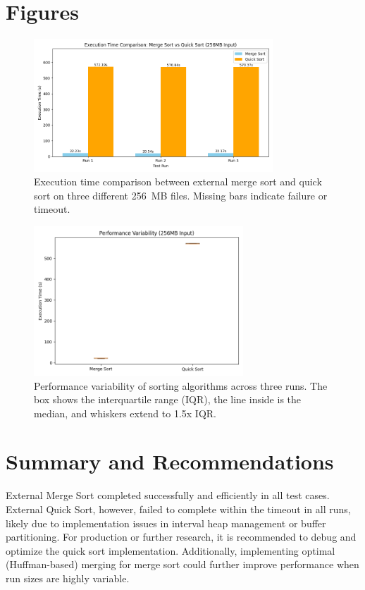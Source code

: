 \documentclass{article}
\begin{document}
\section*{Figures}
\begin{figure}[h!]
\centering
\includegraphics[width=0.8\textwidth]{figures/sort_times_comparison.png}
\caption{Execution time comparison between external merge sort and quick sort on three different 256~MB files. Missing bars indicate failure or timeout.}
\label{fig:sort_times_comparison}
\end{figure}

\begin{figure}[h!]
\centering
\includegraphics[width=0.7\textwidth]{figures/performance_variability.png}
\caption{Performance variability of sorting algorithms across three runs. The box shows the interquartile range (IQR), the line inside is the median, and whiskers extend to 1.5x IQR.}
\label{fig:performance_variability}
\end{figure}

\section*{Summary and Recommendations}
External Merge Sort completed successfully and efficiently in all test cases. External Quick Sort, however, failed to complete within the timeout in all runs, likely due to implementation issues in interval heap management or buffer partitioning. For production or further research, it is recommended to debug and optimize the quick sort implementation. Additionally, implementing optimal (Huffman-based) merging for merge sort could further improve performance when run sizes are highly variable.
\end{document}
